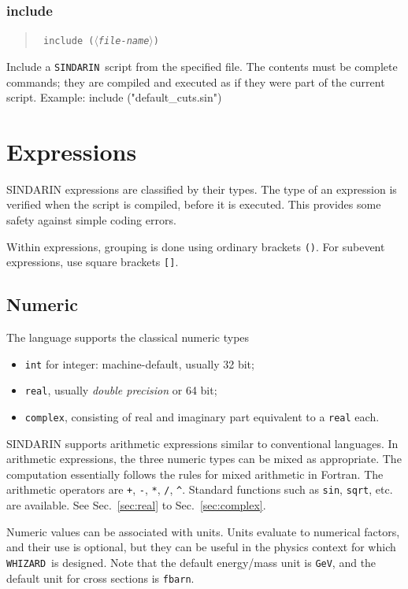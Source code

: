 \documentclass[12pt]{book}
\newenvironment{code}%
  {\begingroup\footnotesize
   \quote
   \verbatim}%
  {\endverbatim
   \endquote
   \endgroup\noindent}
\newenvironment{syntax}%
  {\begin{quote}
   \begin{flushleft}\tt}%
  {\end{flushleft}
   \end{quote}}
\newcommand{\var}[1]{$\langle$\textit{#1}$\rangle$}
\newcommand{\ttt}[1]{\texttt{#1}}
\newcommand{\whizard}{\texttt{WHIZARD}}
\newcommand{\sindarin}{\texttt{SINDARIN}}
\begin{document}
\subsubsection{include}
\begin{syntax}
include (\var{file-name})
\end{syntax}
Include a \sindarin\ script from the specified file.  The contents
must be complete commands; they are compiled and executed as if they
were part of the current script.  Example:
\begin{code}
include ("default_cuts.sin")
\end{code}





\section{Expressions}

SINDARIN expressions are classified by their types.  The
type of an expression is verified when the script is compiled, before
it is executed.  This provides some safety against simple coding
errors.

Within expressions, grouping is done using ordinary brackets \ttt{()}.
For subevent expressions, use square brackets \ttt{[]}.

\subsection{Numeric}
The language supports the classical numeric types
\begin{itemize}
\item 
   \ttt{int} for integer: machine-default, usually 32 bit;
\item
   \ttt{real}, usually \emph{double precision} or 64 bit;
\item
   \ttt{complex}, consisting of real and imaginary part equivalent to a
   \texttt{real} each.
\end{itemize}
SINDARIN supports arithmetic expressions similar to conventional
languages.  In arithmetic expressions, the three numeric types can be
mixed as appropriate.  The computation essentially follows the rules
for mixed arithmetic in Fortran.  The arithmetic operators are
\verb|+|, \verb|-|, \verb|*|, \verb|/|, \verb|^|. Standard functions
such as \ttt{sin}, \ttt{sqrt}, etc. are available.  See
Sec.~\ref{sec:real} to Sec.~\ref{sec:complex}.

Numeric values can be associated with units.  Units evaluate to
numerical factors, and their use is optional, but they can be useful
in the physics context for which \whizard\ is designed.  Note that the
default energy/mass unit is \verb|GeV|, and the default unit for cross
sections is \verb|fbarn|.
\end{document}
